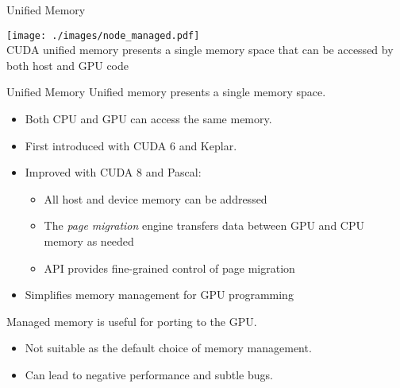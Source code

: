\documentclass[aspectratio=43]{beamer}
\begin{document}
\begin{frame}[fragile]{Unified Memory}
    \begin{center}
        \texttt{[image: ./images/node\_managed.pdf]}
        \\
        CUDA unified memory presents a single memory space that can be accessed by both host and GPU code
    \end{center}
\end{frame}

\begin{frame}[fragile]{Unified Memory}
        Unified memory presents a single memory space.
        \begin{itemize}
            \item Both CPU and GPU can access the same memory.
            \item First introduced with CUDA 6 and Keplar.
            \item Improved with CUDA 8 and Pascal:
            \begin{itemize}
                \item All host and device memory can be addressed
                \item The \emph{page migration} engine transfers data between GPU and CPU memory as needed
                \item API provides fine-grained control of page migration
            \end{itemize}
            \item Simplifies memory management for GPU programming
        \end{itemize}
        \begin{info}{Managed memory is useful for porting to the GPU.}
            \begin{itemize}
                \item Not suitable as the default choice of memory management.
                \item Can lead to negative performance and subtle bugs.
            \end{itemize}
        \end{info}
\end{frame}
\end{document}
